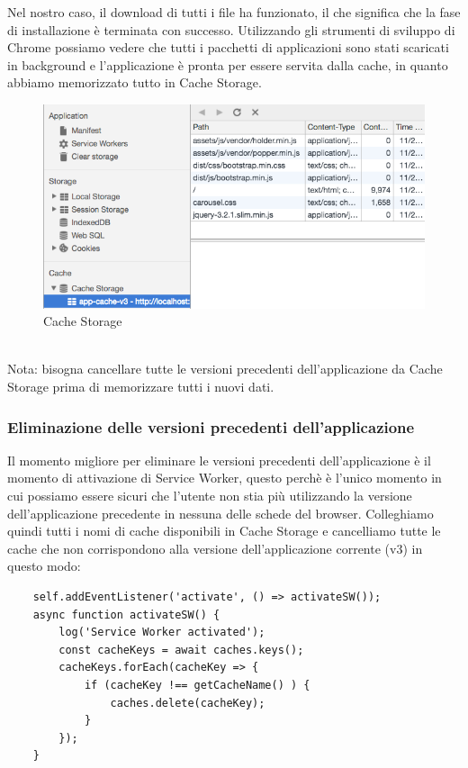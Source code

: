 \documentclass[italian]{article}
\begin{document}
Nel nostro caso, il download di tutti i file ha funzionato, il che significa che la fase di installazione è terminata con successo. Utilizzando gli strumenti di sviluppo di Chrome possiamo vedere che tutti i pacchetti di applicazioni sono stati scaricati in background e l'applicazione è pronta per essere servita dalla cache, in quanto abbiamo memorizzato tutto in Cache Storage.
\begin{figure}[h]
	\centering
	\includegraphics[width=0.8\linewidth]{CacheStorage}
	\caption{Cache Storage}
	\label{fig:Cache Storage}
\end{figure}\\

Nota: bisogna cancellare tutte le versioni precedenti dell'applicazione da Cache Storage prima di memorizzare tutti i nuovi dati.

\subsubsection{Eliminazione delle versioni precedenti dell'applicazione}
Il momento migliore per eliminare le versioni precedenti dell'applicazione è il momento di attivazione di Service Worker, questo perchè è l'unico momento in cui possiamo essere sicuri che l'utente non stia più utilizzando la versione dell'applicazione precedente in nessuna delle schede del browser.
Colleghiamo quindi tutti i nomi di cache disponibili in Cache Storage e cancelliamo tutte le cache che non corrispondono alla versione dell'applicazione corrente (v3) in questo modo:
\begin{lstlisting}
	self.addEventListener('activate', () => activateSW());
	async function activateSW() {
		log('Service Worker activated');
		const cacheKeys = await caches.keys();	
		cacheKeys.forEach(cacheKey => {
			if (cacheKey !== getCacheName() ) {
				caches.delete(cacheKey);
			}
		});
	}
\end{lstlisting}
\end{document}
